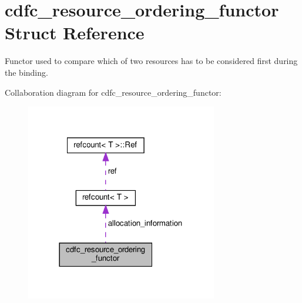 \hypertarget{structcdfc__resource__ordering__functor}{}\section{cdfc\+\_\+resource\+\_\+ordering\+\_\+functor Struct Reference}
\label{structcdfc__resource__ordering__functor}


Functor used to compare which of two resources has to be considered first during the binding.  




Collaboration diagram for cdfc\+\_\+resource\+\_\+ordering\+\_\+functor\+:
\nopagebreak
\begin{figure}[H]
\begin{center}
\leavevmode
\includegraphics[width=237pt]{d9/dd0/structcdfc__resource__ordering__functor__coll__graph}
\end{center}
\end{figure}
